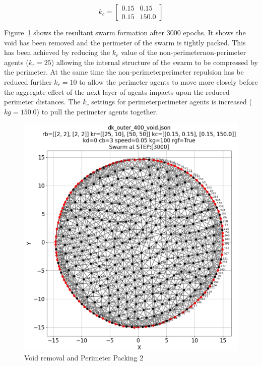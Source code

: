 \documentclass[12pt,a4paper]{IEEEtran}
\newcommand{\kc}{\mathit{k_{c}}}
\newcommand{\kr}{\mathit{k_{r}}}
\begin{document}
\begin{equation}\label{eq:voidPerim3}
	\kc = 
	\begin{bmatrix}
	0.15 & 0.15\\
	0.15 & 150.0 
	\end{bmatrix}
\end{equation}

Figure~\ref{fig:voidPerim2} shows the resultant swarm formation after 3000 epochs. It shows the void has been removed and the perimeter of the swarm is tightly packed. This has been achieved by reducing the $\kr$ value of the non-perimeter\textrightarrow non-perimeter agents ($\kr=25$) allowing the internal structure of the swarm to be compressed by the perimeter. At the same time the non-perimeter\textrightarrow perimeter repulsion has be reduced further $\kr=10$ to allow the perimeter agents to move more closely before the aggregate effect of the next layer of agents impacts upon the reduced perimeter distances. The $\kc$ settings for perimeter\textrightarrow perimeter agents is increased ($kg=150.0$) to pull the perimeter agents together.

\begin{figure}[H]
	\begin{center}
		\includegraphics[width=1.0\linewidth]{figures/voidPerim2}
	\end{center}
	\caption{Void removal and Perimeter Packing 2\label{fig:voidPerim2}}
\end{figure}
\end{document}
